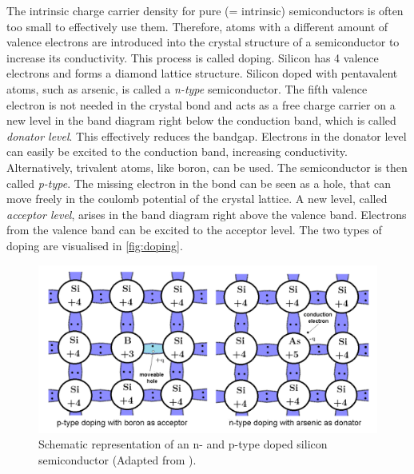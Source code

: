 The intrinsic charge carrier density for pure (= intrinsic) semiconductors is often too small to effectively use them. Therefore, atoms with a different amount of 
valence electrons are introduced
into the crystal structure of a semiconductor to increase its conductivity. This process is called doping. Silicon has 4 valence electrons and forms a diamond lattice structure. 
Silicon doped with pentavalent atoms, such as arsenic, is called a \textit{n-type} semiconductor. The fifth valence electron is not needed in the crystal bond and acts as a free 
charge carrier on a new level in the band diagram right below the conduction band, which is called \textit{donator level}. This effectively reduces the bandgap. 
Electrons in the donator level can easily be excited to the conduction band, increasing conductivity. \\
Alternatively, trivalent atoms, like boron, can be used. The semiconductor is then called \textit{p-type}. The missing electron in the bond can be seen as a hole, that can
move freely in the coulomb potential of the crystal lattice. A new level, called \textit{acceptor level}, arises in the band diagram right above the valence band.
Electrons from the valence band can be excited to the acceptor level.
The two types of doping are visualised in \autoref{fig:doping}.
\begin{figure}
    \centering 
    \includegraphics[width = .75\textwidth]{content/pics/doping.png}
    \caption{Schematic representation of an n- and p-type doped silicon semiconductor (Adapted from \cite{SiliconStrip}).}
    \label{fig:doping}
\end{figure}

